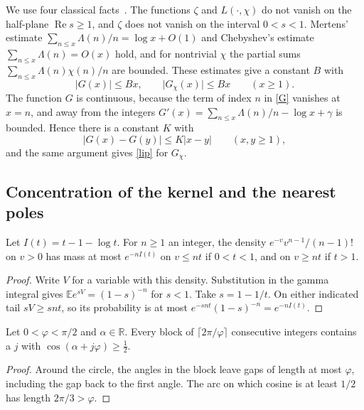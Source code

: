 We use four classical facts~\cite{davenport}. The functions $\zeta$ and $L(\cdot,\chi)$ do not vanish on the half-plane $\operatorname{Re}s\ge1$, and $\zeta$ does not vanish on the interval $0<s<1$. Mertens' estimate $\sum_{n\le x}\Lambda(n)/n=\log x+O(1)$ and Chebyshev's estimate $\sum_{n\le x}\Lambda(n)=O(x)$ hold, and for nontrivial $\chi$ the partial sums $\sum_{n\le x}\Lambda(n)\chi(n)/n$ are bounded. These estimates give a constant $B$ with
\begin{equation}\label{triv}
\lvert G(x)\rvert\le Bx,\qquad \lvert G_\chi(x)\rvert\le Bx\qquad(x\ge1).
\end{equation}
The function $G$ is continuous, because the term of index $n$ in \eqref{G} vanishes at $x=n$, and away from the integers $G'(x)=\sum_{n\le x}\Lambda(n)/n-\log x+\gamma$ is bounded. Hence there is a constant $K$ with
\begin{equation}\label{lip}
\lvert G(x)-G(y)\rvert\le K\lvert x-y\rvert\qquad(x,y\ge1),
\end{equation}
and the same argument gives \eqref{lip} for $G_\chi$.

\subsection{Concentration of the kernel and the nearest poles}

\begin{lemma}\label{tails}
Let $I(t)=t-1-\log t$. For $n\ge1$ an integer, the density
$e^{-v}v^{n-1}/(n-1)!$ on $v>0$ has mass at most $e^{-nI(t)}$
on $v\le nt$ if $0<t<1$, and on $v\ge nt$ if $t>1$.
\end{lemma}

\begin{proof}
Write $V$ for a variable with this density. Substitution in the gamma
integral gives $\mathbb E e^{sV}=(1-s)^{-n}$ for $s<1$.
Take $s=1-1/t$. On either indicated tail $sV\ge snt$, so its
probability is at most $e^{-snt}(1-s)^{-n}=e^{-nI(t)}$.
\end{proof}

\begin{lemma}\label{rot}
Let $0<\varphi<\pi/2$ and $\alpha\in\mathbb R$. Every block of
$\lceil2\pi/\varphi\rceil$ consecutive integers contains a $j$
with $\cos(\alpha+j\varphi)\ge\tfrac12$.
\end{lemma}

\begin{proof}
Around the circle, the angles in the block leave gaps of length at most
$\varphi$, including the gap back to the first angle. The arc on which
cosine is at least $1/2$ has length $2\pi/3>\varphi$.
\end{proof}

